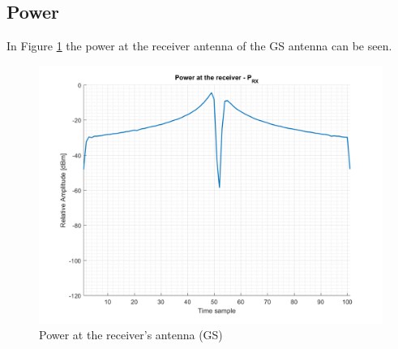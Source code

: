 \subsection{Power}
In Figure \ref{fig:s3_power} the power at the receiver antenna of the GS antenna can be seen.

\begin{figure}[H]
	\centering
	\includegraphics[scale=0.75]{figures/s3_power.png}
	\caption{Power at the receiver's antenna (GS)}
	\label{fig:s3_power}
\end{figure}